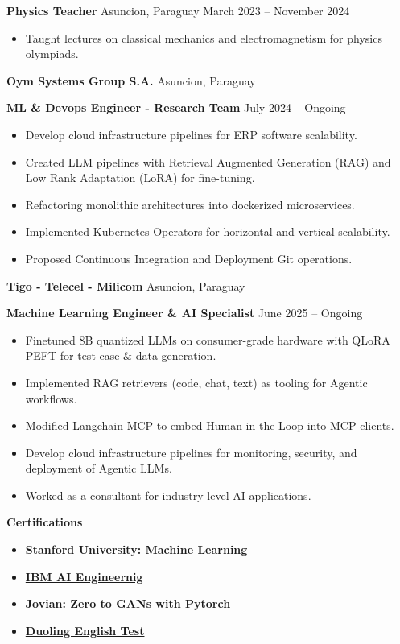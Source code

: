 \documentclass[11pt]{article}
\begin{document}
\textbf{Physics Teacher}	\hfill Asuncion, Paraguay
\hfill March 2023 – November 2024
\begin{itemize}[noitemsep]
  \item Taught lectures on classical mechanics and electromagnetism for physics olympiads.
\end{itemize}

\textbf{Oym Systems Group S.A.}	\hfill Asuncion, Paraguay

\textbf{ML \& Devops Engineer - Research Team} \hfill July 2024 – Ongoing
\begin{itemize}[noitemsep]
  \item Develop cloud infrastructure pipelines for ERP software scalability.
  \item Created LLM pipelines with Retrieval Augmented Generation (RAG) and Low Rank Adaptation (LoRA) for fine-tuning.
  \item Refactoring monolithic architectures into dockerized microservices.
  \item Implemented Kubernetes Operators for horizontal and vertical scalability.
  \item Proposed Continuous Integration and Deployment Git operations.
\end{itemize}

\textbf{Tigo - Telecel - Milicom}	\hfill Asuncion, Paraguay

\textbf{Machine Learning Engineer \& AI Specialist} \hfill June 2025 – Ongoing
\begin{itemize}[noitemsep]
  \item Finetuned 8B quantized LLMs on consumer-grade hardware with QLoRA PEFT for test case \& data generation.
  \item Implemented RAG retrievers (code, chat, text) as tooling for Agentic workflows.
  \item Modified Langchain-MCP to embed Human-in-the-Loop into MCP clients.
  \item Develop cloud infrastructure pipelines for monitoring, security, and deployment of Agentic LLMs.
  \item Worked as a consultant for industry level AI applications.
\end{itemize}

\begin{center}
    \textbf{Certifications}
\end{center}

\begin{itemize}
    \item \href{https://www.coursera.org/account/accomplishments/specialization/certificate/VNCPL4MXPB5A}{\textbf{Stanford University: Machine Learning}}
    \item \href{https://www.coursera.org/account/accomplishments/specialization/certificate/JEYSUHXTCYU5}{\textbf{IBM AI Engineernig}}
    \item \href{https://jovian.com/certificate/MFQTQMZXGM}{\textbf{Jovian: Zero to GANs with Pytorch}}
    \item \href{https://certs.duolingo.com/vc54x03gh7zcprnd}{\textbf{Duoling English Test}}
\end{itemize}
\end{document}
